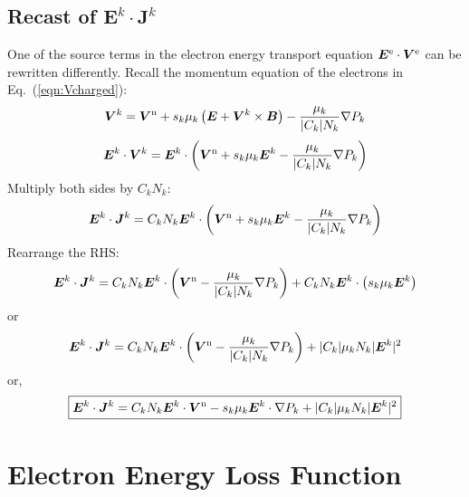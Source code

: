\documentclass{warpdoc}
\newcommand\frameeqn[1]{\fbox{$\displaystyle #1$}}
\renewcommand{\vec}[1]{\bm{#1}}
\begin{document}
%

\subsection{Recast of $\vec{E}^k \cdot \vec{J}^k$}

One of the source terms in the electron energy transport equation $\vec{E}^{\rm e} \cdot \vec{V}^{\rm e}$ can be rewritten differently. Recall the momentum equation of the electrons in Eq.\ (\ref{eqn:Vcharged}):
%
\begin{equation}
  \vec{V}^k=\vec{V}^{\rm n} + s_k \mu_k \left(\vec{E}+\vec{V}^k \times \vec{B}\right)-\frac{\mu_k}{|C_k| N_k}\nabla P_k
\end{equation}
% 
%
\begin{equation}
\vec{E}^k \cdot \vec{V}^k 
 = \vec{E}^k \cdot \left( \vec{V}^{\rm n} + s_k \mu_k \vec{E}^k-\frac{\mu_k}{|C_k| N_k}\nabla P_k \right)
\end{equation}
% 
Multiply both sides by $C_k N_k$:
%
\begin{equation}
\vec{E}^k \cdot \vec{J}^k 
 = C_k N_k \vec{E}^k \cdot \left( \vec{V}^{\rm n} + s_k \mu_k \vec{E}^k-\frac{\mu_k}{|C_k| N_k}\nabla P_k \right)
\end{equation}
% 
Rearrange the RHS:
%
\begin{equation}
\vec{E}^k \cdot \vec{J}^k 
 = C_k N_k \vec{E}^k \cdot \left( \vec{V}^{\rm n} -\frac{\mu_k}{|C_k| N_k}\nabla P_k \right)
  +C_k N_k \vec{E}^k \cdot \left(  s_k \mu_k \vec{E}^k \right)
\end{equation}
% 
or
%
\begin{equation}
\vec{E}^k \cdot \vec{J}^k 
 = C_k N_k \vec{E}^k \cdot \left( \vec{V}^{\rm n} -\frac{\mu_k}{|C_k| N_k}\nabla P_k \right)
  +|C_k| \mu_k N_k |\vec{E}^k|^2
\end{equation}
% 
or,
%
\begin{equation}
\frameeqn{
\vec{E}^k \cdot \vec{J}^k 
 =   C_k N_k \vec{E}^k \cdot \vec{V}^{\rm n} - s_k \mu_k \vec{E}^k \cdot \nabla P_k 
  +|C_k| \mu_k N_k |\vec{E}^k|^2
}
\end{equation}
% 




\section{Electron Energy Loss Function}
\end{document}
